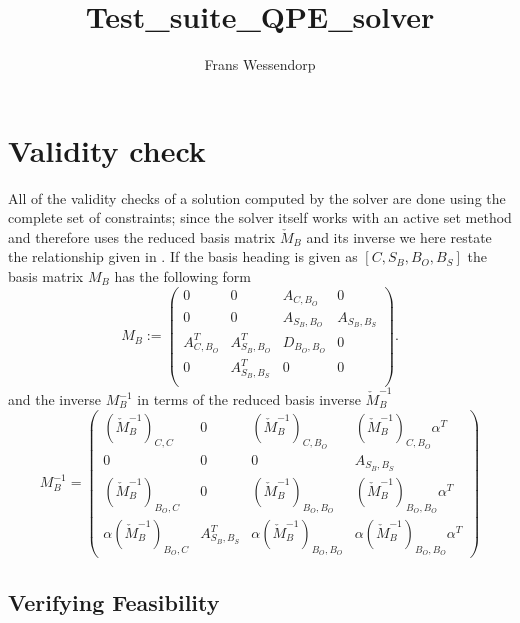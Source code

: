 \documentclass[a4paper]{article}
\title{Test\_suite\_QPE\_solver}
\author{Frans Wessendorp}
\begin{document}
\maketitle
\section{Validity check}
All of the validity checks of a solution computed by the solver are done using
the complete set of constraints; since the solver itself works with an active
set method and therefore uses the reduced basis matrix $\check{M}_{B}$
and its inverse we here restate the relationship given in \cite{Frans_Deg}. 
If the basis heading is given as
$\left[C, S_{B}, B_{O}, B_{S} \right]$ the basis matrix
$M_{B}$ has the following form
\begin{equation}
\label{def:basis_matrix}
M_{B}:=
\left(\begin{array}{c|c|c|c}
        0 & 0 & A_{C, B_{O}} & 0 \\
        \hline
	0 & 0 & A_{S_{B}, B_{O}} & A_{S_{B}, B_{S}} \\
	\hline
        A_{C, B_{O}}^{T} & A_{S_{B}, B_{O}}^{T} & D_{B_{O}, B_{O}}
	  & 0 \\
        \hline
        0 & A_{S_{B}, B_{S}}^{T} & 0
	  & 0 \\
      \end{array}
\right).
\end{equation}
and the inverse $M_{B}^{-1}$ in terms of the reduced basis inverse
$\check{M}_{B}^{-1}$
\begin{equation}
\label{eq:M_B_inv_exp}
M_{B}^{-1}=
\left(\begin{array}{c|c|c|c}
        \left(\check{M}_{B}^{-1}\right)_{C,C} &
	0 &
	\left(\check{M}_{B}^{-1}\right)_{C,B_{O}} &
	 \left(\check{M}_{B}^{-1}\right)_{C, B_{O}}\alpha^{T} \\
	\hline
	0 &
	0 &
	0 &
	A_{S_{B},B_{S}} \\
	\hline
	\left(\check{M}_{B}^{-1}\right)_{B_{O}, C} &
	0 &
	\left(\check{M}_{B}^{-1}\right)_{B_{O}, B_{O}} &
          \left(\check{M}_{B}^{-1}\right)_{B_{O},B_{O}}\alpha^{T} \\
	\hline
	\alpha\left(\check{M}_{B}^{-1}\right)_{B_{O},
	C} &
	A_{S_{B}, B_{S}}^{T} &
	\alpha\left(\check{M}_{B}^{-1}\right)_{B_{O},
	B_{O}} &
	\alpha\left(\check{M}_{B}^{-1}\right)_{B_{O}, B_{O}}\alpha^{T}
      \end{array}
\right)
\end{equation}


\subsection{Verifying Feasibility}
\end{document}
